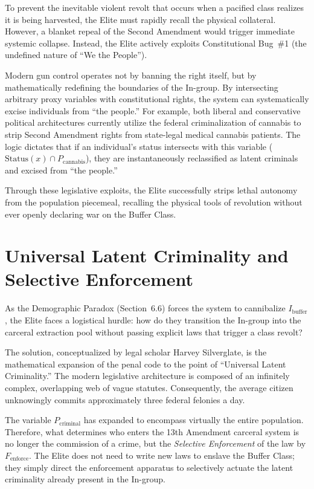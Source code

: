 \documentclass[12pt,openany]{book}
\begin{document}
To prevent the inevitable violent revolt that occurs when a pacified class realizes it is being harvested, the Elite must rapidly recall the physical collateral. However, a blanket repeal of the Second Amendment would trigger immediate systemic collapse. Instead, the Elite actively exploits Constitutional Bug~\#1 (the undefined nature of ``We the People'').

Modern gun control operates not by banning the right itself, but by mathematically redefining the boundaries of the In-group. By intersecting arbitrary proxy variables with constitutional rights, the system can systematically excise individuals from ``the people.'' For example, both liberal and conservative political architectures currently utilize the federal criminalization of cannabis to strip Second Amendment rights from state-legal medical cannabis patients. The logic dictates that if an individual's status intersects with this variable ($\text{Status}(x) \cap P_{\text{cannabis}}$), they are instantaneously reclassified as latent criminals and excised from ``the people.''

Through these legislative exploits, the Elite successfully strips lethal autonomy from the population piecemeal, recalling the physical tools of revolution without ever openly declaring war on the Buffer Class.
\section{Universal Latent Criminality and Selective Enforcement}

As the Demographic Paradox (Section~6.6) forces the system to cannibalize $I_{\text{buffer}}$, the Elite faces a logistical hurdle: how do they transition the In-group into the carceral extraction pool without passing explicit laws that trigger a class revolt?

The solution, conceptualized by legal scholar Harvey Silverglate, is the mathematical expansion of the penal code to the point of ``Universal Latent Criminality.'' The modern legislative architecture is composed of an infinitely complex, overlapping web of vague statutes. Consequently, the average citizen unknowingly commits approximately three federal felonies a day.

The variable $P_{\text{criminal}}$ has expanded to encompass virtually the entire population. Therefore, what determines who enters the 13th Amendment carceral system is no longer the commission of a crime, but the \textit{Selective Enforcement} of the law by $F_{\text{enforce}}$. The Elite does not need to write new laws to enslave the Buffer Class; they simply direct the enforcement apparatus to selectively actuate the latent criminality already present in the In-group.
\end{document}
